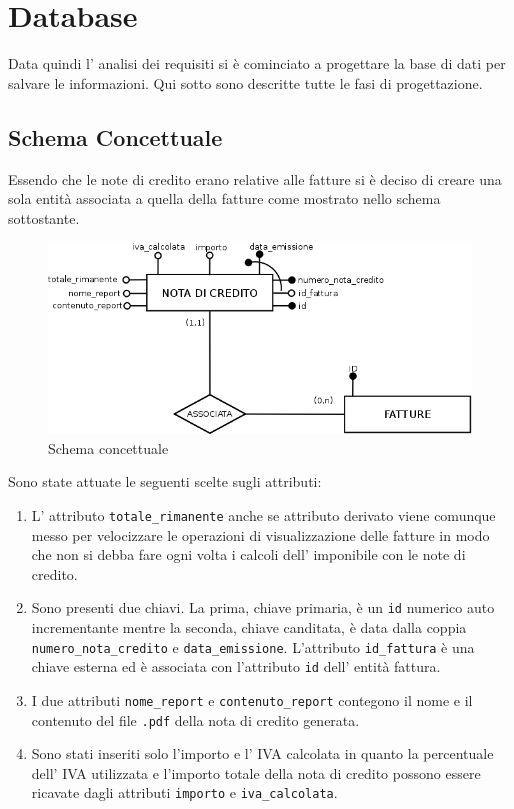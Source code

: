 \documentclass[12pt]{book}
\begin{document}
\section{Database}
Data quindi l' analisi dei requisiti si è cominciato a progettare la base di 
dati per salvare le informazioni.
Qui sotto sono descritte tutte le fasi di progettazione.
\subsection{Schema Concettuale}
Essendo che le note di credito erano relative alle fatture si è deciso di 
creare una sola entità associata a quella della fatture come mostrato nello 
schema sottostante.
\begin{figure}[H]
    \centering
    \includegraphics[scale=0.5]{img/schema_concettuale}
    \caption{Schema concettuale}\label{schema:concettuale}
\end{figure}
Sono state attuate le seguenti scelte sugli attributi:
\begin{enumerate}
    \item L' attributo \texttt{totale\_rimanente} anche se attributo 
        derivato viene comunque messo per velocizzare le operazioni di 
        visualizzazione delle fatture in modo che non si debba fare ogni volta 
        i calcoli dell’ imponibile con le note di credito.
    \item Sono presenti due chiavi. La prima, chiave primaria, è un \texttt{id} 
        numerico auto incrementante mentre la seconda, chiave canditata, è 
        data dalla coppia \texttt{numero\_nota\_credito} e 
        \texttt{data\_emissione}.
        L'attributo \texttt{id\_fattura} è una chiave esterna ed è associata 
        con l'attributo \texttt{id} dell' entità fattura.
    \item I due attributi \texttt{nome\_report} e 
        \texttt{contenuto\_report} contegono il nome e il contenuto 
        del file \texttt{.pdf} della nota di credito generata.
    \item Sono stati inseriti solo l’importo e l’ IVA calcolata in 
        quanto la percentuale dell’ IVA utilizzata e l’importo totale della 
        nota di credito possono essere ricavate dagli attributi \texttt{importo}
        e \texttt{iva\_calcolata}.
\end{enumerate}
\end{document}
